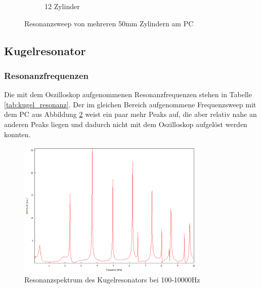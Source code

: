 \begin{figure}
\begin{subfigure}{0.32\textwidth}
    \caption{12 Zylinder}
  \end{subfigure}
  \caption{Resonanzsweep von mehreren 50mm Zylindern am PC}
  \label{fig:plot_zylinder_sweep}
\end{figure}

\subsection{Kugelresonator}
\subsubsection{Resonanzfrequenzen}
Die mit dem Oszilloskop aufgenommenen Resonanzfrequenzen stehen in Tabelle \ref{tab:kugel_resonanz}.
Der im gleichen Bereich aufgenommene Frequenzsweep mit dem PC aus Abbildung \ref{fig:kugel_resonanz} weist ein paar mehr Peaks auf,
die aber relativ nahe an anderen Peaks liegen und dadurch nicht mit dem Oszilloskop aufgelöst werden konnten.

\begin{figure}
  \centering
  \includegraphics[width=0.8\textwidth]{Bilder/PC_Kugelresonator/180_100-10000Hz.png}
  \caption{Resonanzspektrum des Kugelresonators bei 100-10000Hz}
  \label{fig:kugel_resonanz}
\end{figure}

